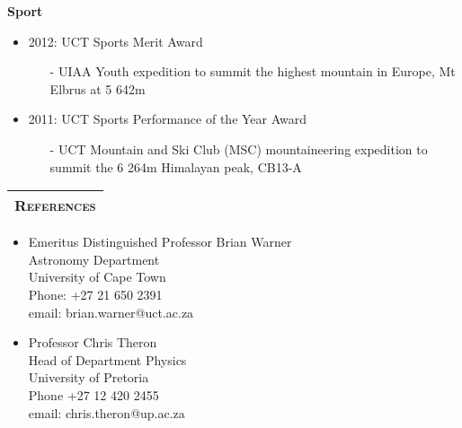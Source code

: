 \documentclass{article}
\renewcommand{\section}[1]{
  \vspace{0.4cm}
  \begin{table}[!htp]					%
    \newcolumntype{C}{>{\centering\arraybackslash}X}	%
    \setlength\extrarowheight{3pt} 			%

    \noindent 						%
    \begin{tabularx}{\textwidth}{C}
    \hline \hline 
      \large \textbf{ \textsc{#1} } \\ 
    \hline \hline
    \end{tabularx}
  \end{table}
}
\begin{document}
\large\textbf{Sport}
\vspace{0.2cm}
\normalsize
\begin{itemize}
  \item 2012: UCT Sports Merit Award
  \begin{itemize}
      \item[-] UIAA Youth expedition to summit the highest mountain in Europe, Mt Elbrus at 5 642m
  \end{itemize}
  \item 2011: UCT Sports Performance of the Year Award
  \begin{itemize}
      \item[-] UCT Mountain and Ski Club (MSC) mountaineering expedition to summit the 6 264m Himalayan peak, CB13-A	
  \end{itemize}
 
\end{itemize}


\section{References}
\begin{itemize}
 \item Emeritus Distinguished Professor Brian Warner\\Astronomy Department\\University of Cape Town\\Phone: +27 21 650 2391\\email: brian.warner@uct.ac.za
 \item Professor Chris Theron\\Head of Department Physics\\ University of Pretoria\\Phone +27 12 420 2455\\email: chris.theron@up.ac.za
\end{itemize}
% 
%  
%  
%  
%  
%  
%  
%  
%  
\end{document}
